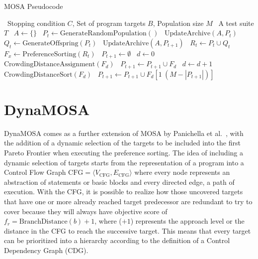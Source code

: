 \documentclass[%
  chapterprefix=false,%
  open=right,%
  twoside=true,%
  paper=a4,%
  logofile={Figures/logo.png},%
  thesistype=master,%
  UKenglish,%
]{se2thesis}
\begin{document}
\begin{algorithm}[htb]
  \centering
  \caption{MOSA Pseudocode}\label{alg:MOSApseudo}
  \begin{algorithmic}[1]
    \Require~Stopping condition \(C\), Set of program targets \(B\), Population size \(M\)
    \Ensure~A test suite \(T\)
    \State~\(A \gets \{\}\)
    \State~\(P_t \gets \text{GenerateRandomPopulation}()\)
    \State~\(\text{UpdateArchive}(A, P_t)\)
      \State~\(Q_t \gets \text{GenerateOffspring}(P_t)\)
      \State~\(\text{UpdateArchive}(A, P_{t+1})\)
      \State~\(R_t \gets P_t \cup Q_t\)
      \State~\(F_x \gets \text{PreferenceSorting}(R_t)\)
      \State~\(P_{t+1} \gets \emptyset \)
      \State~\(d \gets 0\)
        \State~\(\text{CrowdingDistanceAssignment}(F_d)\)
        \State~\(P_{t+1} \gets P_{t+1} \cup F_d\)
        \State~\(d \gets d + 1\)
      \EndWhile\@
      \State~\(\text{CrowdingDistanceSort}(F_d)\)
      \State~\(P_{t+1} \gets P_{t+1} \cup F_d[1\: (M - |P_{t+1}|)]\)
    \EndWhile\@
  \end{algorithmic}
\end{algorithm}

\section{DynaMOSA}\label{sec:dynamosa}

DynaMOSA comes as a further extension of MOSA by Panichella et al.~\cite{DBLP:journals/tse/PanichellaKT18}, with the addition of a dynamic selection of the targets to be included into the first Pareto Frontier when executing the preference sorting.
The idea of including a dynamic selection of targets starts from the representation of a program into a Control Flow Graph \(\text{CFG} = \langle V_{\text{CFG}}, E_{\text{CFG}} \rangle\) where every node represents an abstraction of statements or basic blocks and every directed edge, a path of execution.
With the CFG, it is possible to realize how those uncovered targets that have one or more already reached target predecessor are redundant to try to cover because they will always have objective score of \(f_r = \text{BranchDistance}(b) + 1\), where (\(+1\)) represents the approach level or the distance in the CFG to reach the successive target.
This means that every target can be prioritized into a hierarchy according to the definition of a Control Dependency Graph (CDG).
\end{document}
